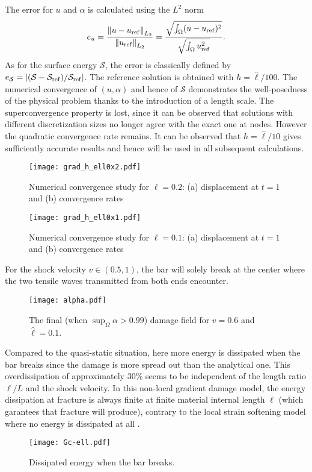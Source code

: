 The error for $u$ and $\alpha$ is calculated using the $L^2$ norm
\[
e_u=\frac{\left\lVert{u-u_\mathrm{ref}}\right\rVert_{L_2}}{\left\lVert{u_\mathrm{ref}}\right\rVert_{L_2}}=\frac{\sqrt{\int_\Omega(u-u_\mathrm{ref})^2}}{\sqrt{\int_\Omega u_\mathrm{ref}^2}}.
\]
As for the surface energy $\mathcal{S}$, the error is classically defined by $e_\mathcal{S}=\left\lvert{(\mathcal{S}-\mathcal{S}_\mathrm{ref})/\mathcal{S}_\mathrm{ref}}\right\rvert$. The reference solution is obtained with $h=\widehat{\ell}/100$. The numerical convergence of $(u,\alpha)$ and hence of $\mathcal{S}$ demonstrates the well-posedness of the physical problem thanks to the introduction of a length scale. The superconvergence property is lost, since it can be observed that solutions with different discretization sizes no longer agree with the exact one at nodes. However the quadratic convergence rate remains. It can be observed that $h=\widehat{\ell}/10$ gives sufficiently accurate results and hence will be used in all subsequent calculations.
\begin{figure}[htbp]
\texttt{[image: grad\_h\_ell0x2.pdf]}
\caption{Numerical convergence study for $\ell=0.2$: (a) displacement at $t=1$ and (b) convergence rates}
\end{figure}
\begin{figure}[htbp]
\texttt{[image: grad\_h\_ell0x1.pdf]}
\caption{Numerical convergence study for $\ell=0.1$: (a) displacement at $t=1$ and (b) convergence rates}
\end{figure}

For the shock velocity $v\in(0.5, 1)$, the bar will solely break at the center where the two tensile waves transmitted from both ends encounter.
\begin{figure}[htbp]
\texttt{[image: alpha.pdf]}
\caption{The final (when $\sup_\Omega\alpha>0.99$) damage field for $v=0.6$ and $\widehat{\ell}=0.1$.}
\end{figure}

Compared to the quasi-static situation, here more energy is dissipated when the bar breaks since the damage is more spread out than the analytical one. This overdissipation of approximately 30\% seems to be independent of the length ratio $\ell/L$ and the shock velocity. In this non-local gradient damage model, the energy dissipation at fracture is always finite at finite material internal length $\ell$ (which garantees that fracture will produce), contrary to the local strain softening model where no energy is dissipated at all \cite{Bazant:1985aa}.
\begin{figure}[htbp]
\texttt{[image: Gc-ell.pdf]}
\caption{Dissipated energy when the bar breaks.} \label{fig:Gc-ell}
\end{figure}

